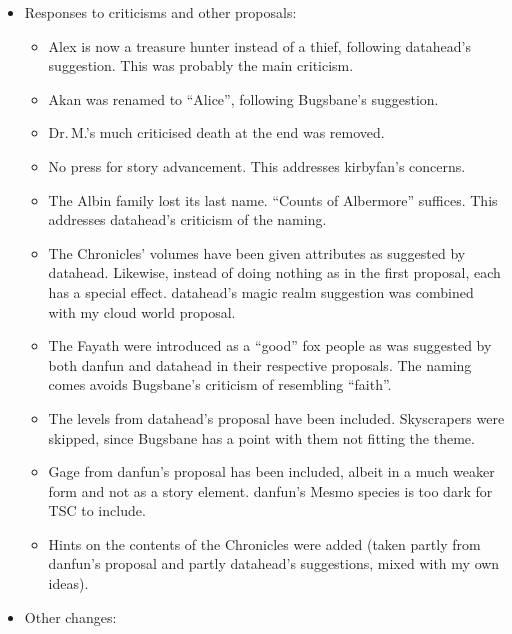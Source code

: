 \documentclass{gd-document}
\newcommand\DrM{Dr.\,M.\xspace}
\begin{document}
\begin{itemize}
  \item Responses to criticisms and other proposals:

    \begin{itemize}
    \item Alex is now a treasure hunter instead of a thief,
      following datahead’s suggestion. This was probably the main
      criticism.
    \item Akan was renamed to “Alice”, following Bugsbane’s
      suggestion.
    \item \DrM{}’s much criticised death at the end was removed.
    \item No press for story advancement. This addresses kirbyfan’s
      concerns.
    \item The Albin family lost its last name. “Counts of Albermore”
      suffices. This addresses datahead’s criticism of the naming.
    \item The Chronicles’ volumes have been given attributes as
      suggested by datahead. Likewise, instead of doing nothing as in
      the first proposal, each has a special effect. datahead’s magic
      realm suggestion was combined with my cloud world proposal.
    \item The Fayath were introduced as a “good” fox people as was
      suggested by both danfun and datahead in their respective
      proposals. The naming comes avoids Bugsbane’s criticism of
      resembling “faith”.
    \item The levels from datahead’s proposal have been
      included. Skyscrapers were skipped, since Bugsbane has a point
      with them not fitting the theme.
    \item Gage from danfun’s proposal has been included, albeit in a
      much weaker form and not as a story element. danfun’s Mesmo
      species is too dark for TSC to include.
    \item Hints on the contents of the Chronicles were added (taken
      partly from danfun’s proposal and partly datahead’s suggestions,
      mixed with my own ideas).
    \end{itemize}

  \item Other changes:


\end{itemize}
\end{document}

